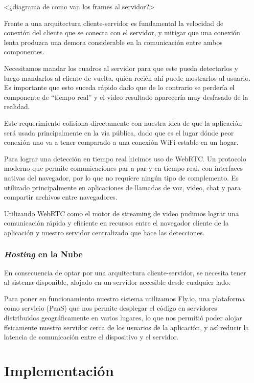 \documentclass[a4paper]{article}
\begin{document}
<¿diagrama de como van los frames al servidor?>

Frente a una arquitectura cliente-servidor es fundamental la velocidad de conexión del cliente que se conecta con el servidor, y mitigar que una conexión lenta produzca una demora considerable en la comunicación entre ambos componentes.

Necesitamos mandar los cuadros al servidor para que este pueda detectarlos y luego mandarlos al cliente de vuelta, quién recién ahí puede mostrarlos al usuario. Es importante que esto suceda rápido dado que de lo contrario se perdería el componente de “tiempo real” y el video resultado aparecería muy desfasado de la realidad.

Este requerimiento colisiona directamente con nuestra idea de que la aplicación será usada principalmente en la vía pública, dado que es el lugar dónde peor conexión uno va a tener comparado a una conexión WiFi estable en un hogar.

Para lograr una detección en tiempo real hicimos uso de WebRTC. Un protocolo moderno que permite comunicaciones par-a-par y en tiempo real, con interfaces nativas del navegador, por lo que no requiere ningún tipo de complemento. Es utilizado principalmente en aplicaciones de llamadas de voz, video, chat y para compartir archivos entre navegadores.

Utilizando WebRTC como el motor de streaming de video pudimos lograr una comunicación rápida y eficiente en recursos entre el navegador cliente de la aplicación y nuestro servidor centralizado que hace las detecciones.

\subsubsection{\textit{Hosting} en la Nube}

En consecuencia de optar por una arquitectura cliente-servidor, se necesita tener al sistema disponible, alojado en un servidor accesible desde cualquier lado.

Para poner en funcionamiento nuestro sistema utilizamos Fly.io, una plataforma como servicio (PaaS) que nos permite desplegar el código en servidores distribuidos geográficamente en varios lugares, lo que nos permitió poder alojar físicamente nuestro servidor cerca de los usuarios de la aplicación, y así reducir la latencia de comunicación entre el dispositivo y el servidor.

\section{Implementación}
\end{document}
